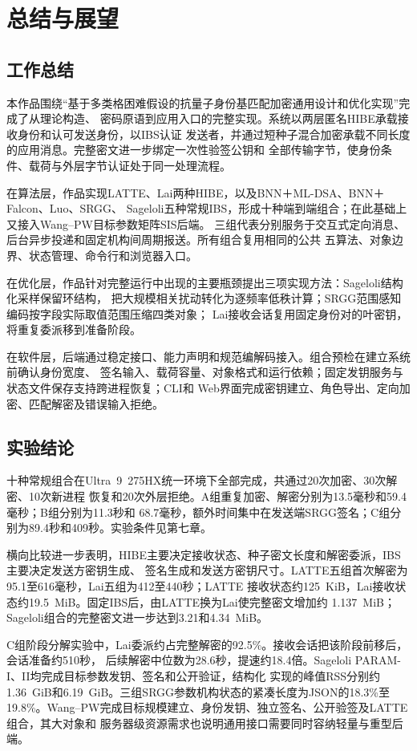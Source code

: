 \chapter{总结与展望}

\section{工作总结}

本作品围绕“基于多类格困难假设的抗量子身份基匹配加密通用设计和优化实现”完成了从理论构造、
密码原语到应用入口的完整实现。系统以两层匿名HIBE承载接收身份和认可发送身份，以IBS认证
发送者，并通过短种子混合加密承载不同长度的应用消息。完整密文进一步绑定一次性验签公钥和
全部传输字节，使身份条件、载荷与外层字节认证处于同一处理流程。

在算法层，作品实现LATTE、Lai两种HIBE，以及BNN＋ML-DSA、BNN＋Falcon、Luo、SRGG、
Sageloli五种常规IBS，形成十种端到端组合；在此基础上又接入Wang--PW目标参数矩阵SIS后端。
三组代表分别服务于交互式定向消息、后台异步投递和固定机构间周期报送。所有组合复用相同的公共
五算法、对象边界、状态管理、命令行和浏览器入口。

在优化层，作品针对完整运行中出现的主要瓶颈提出三项实现方法：Sageloli结构化采样保留环结构，
把大规模相关扰动转化为逐频率低秩计算；SRGG范围感知编码按字段实际取值范围压缩四类对象；
Lai接收会话复用固定身份对的叶密钥，将重复委派移到准备阶段。

在软件层，后端通过稳定接口、能力声明和规范编解码接入。组合预检在建立系统前确认身份宽度、
签名输入、载荷容量、对象格式和运行依赖；固定发钥服务与状态文件保存支持跨进程恢复；CLI和
Web界面完成密钥建立、角色导出、定向加密、匹配解密及错误输入拒绝。

\section{实验结论}

十种常规组合在Ultra~9~275HX统一环境下全部完成，共通过20次加密、30次解密、10次新进程
恢复和20次外层拒绝。A组重复加密、解密分别为13.5毫秒和59.4毫秒；B组分别为11.3秒和
68.7毫秒，额外时间集中在发送端SRGG签名；C组分别为89.4秒和409秒。实验条件见第七章。

横向比较进一步表明，HIBE主要决定接收状态、种子密文长度和解密委派，IBS主要决定发送方密钥生成、
签名生成和发送方密钥尺寸。LATTE五组首次解密为95.1至616毫秒，Lai五组为412至440秒；LATTE
接收状态约125~KiB，Lai接收状态约19.5~MiB。固定IBS后，由LATTE换为Lai使完整密文增加约
1.137~MiB；Sageloli组合的完整密文进一步达到3.21和4.34~MiB。

C组阶段分解实验中，Lai委派约占完整解密的92.5\%。接收会话把该阶段前移后，会话准备约510秒，
后续解密中位数为28.6秒，提速约18.4倍。Sageloli PARAM-I、II均完成目标参数发钥、签名和公开验证，结构化
实现的峰值RSS分别约1.36~GiB和6.19~GiB。三组SRGG参数机构状态的紧凑长度为JSON的18.3\%至
19.8\%。Wang--PW完成目标规模建立、身份发钥、独立签名、公开验签及LATTE组合，其大对象和
服务器级资源需求也说明通用接口需要同时容纳轻量与重型后端。

